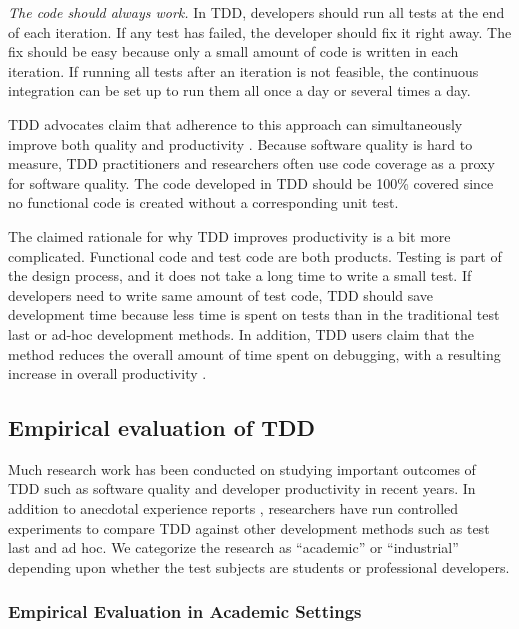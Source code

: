 \documentclass[smallextended]{svjour3}     %
\begin{document}
{\em The code should always work.} 
In TDD, developers should run 
all tests at the end of each iteration. If any test has failed, 
the developer should fix it right away. The fix should be easy because 
only a small amount of code is written in each iteration. If running 
all tests after an iteration is not feasible, the continuous 
integration can be set up to run them all once a day or several 
times a day. 

TDD advocates claim that adherence to this approach can simultaneously
improve both quality and productivity \citep{Beck:01,Janzen:05}.  Because
software quality is hard to measure, TDD practitioners and researchers
often use code coverage as a proxy for software quality. The code developed
in TDD should be 100\% covered since no functional code is created without
a corresponding unit test.

The claimed rationale for why TDD improves productivity is a bit more
complicated. Functional code and test code are both products. Testing is
part of the design process, and it does not take a long time to write a
small test. If developers need to write same amount of test code, TDD
should save development time because less time is spent on tests than in
the traditional test last or ad-hoc development methods. In addition, TDD
users claim that the method reduces the overall amount of time spent on
debugging, with a resulting increase in overall
productivity \citep{Williams:03}.

\subsection{Empirical evaluation of TDD}
\label{sec:related-empirical}

Much research work has been conducted on studying important outcomes of TDD
such as software quality and developer productivity in recent years. In
addition to anecdotal experience reports
\citep{George:04,Maximilien:03,Williams:03,Kaufmann:03,Edwards:04,Bhat:06},
researchers have run controlled experiments
\citep{Muller:02,Matjaz:03,Erdogmus:05} to compare TDD against other
development methods such as test last and ad hoc. We categorize the
research as ``academic'' or ``industrial'' depending upon whether the test
subjects are students or professional developers.

\subsubsection{Empirical Evaluation in Academic Settings}
\end{document}
